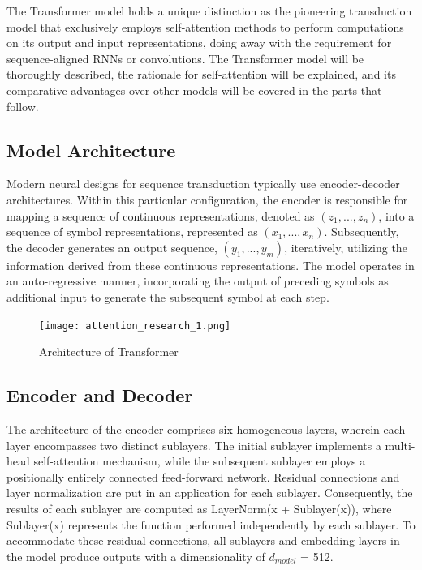The Transformer model holds a unique distinction as the pioneering transduction model that exclusively employs self-attention methods to perform computations on its output and input representations, doing away with the requirement for sequence-aligned RNNs or convolutions. The Transformer model will be thoroughly described, the rationale for self-attention will be explained, and its comparative advantages over other models will be covered in the parts that follow.


\subsection{Model Architecture}
Modern neural designs for sequence transduction typically use encoder-decoder architectures. Within this particular configuration, the encoder is responsible for mapping a sequence of continuous representations, denoted as $(z_1,..., z_n)$, into a sequence of symbol representations, represented as $(x_1,..., x_n)$. Subsequently, the decoder generates an output sequence, $(y_1,..., y_m)$, iteratively, utilizing the information derived from these continuous representations. The model operates in an auto-regressive manner, incorporating the output of preceding symbols as additional input to generate the subsequent symbol at each step.

\begin{figure}[!h]
    \centering
    \texttt{[image: attention\_research\_1.png]}
    \label{fig:transformer}
    \caption{Architecture of Transformer\cite{attention}}
\end{figure}

\subsection{Encoder and Decoder}

The architecture of the encoder comprises six homogeneous layers, wherein each layer encompasses two distinct sublayers. The initial sublayer implements a multi-head self-attention mechanism, while the subsequent sublayer employs a positionally entirely connected feed-forward network. Residual connections and layer normalization are put in an application for each sublayer. Consequently, the results of each sublayer are computed as LayerNorm(x + Sublayer(x)), where Sublayer(x) represents the function performed independently by each sublayer. To accommodate these residual connections, all sublayers and embedding layers in the model produce outputs with a dimensionality of $d_{model}$ = 512.

